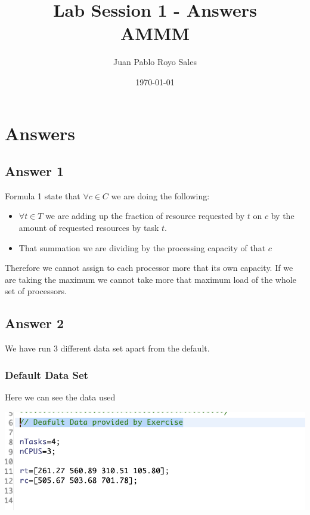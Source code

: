 \documentclass[12pt, a4paper]{article}
\title{
  Lab Session 1 - Answers \\
  AMMM
}
\author{Juan Pablo Royo Sales}
\date\today
\begin{document}
\begin{titlingpage}
  \maketitle
\end{titlingpage}

\section{Answers}
\subsection{Answer 1}\label{answer_1}

Formula 1 state that $\forall c \in C$ we are doing the following:


\begin{itemize}
  \item $\forall t \in T$ we are adding up the fraction of resource requested by
    $t$ on $c$ by the amount of requested resources by task $t$.
  \item That summation we are dividing by the processing capacity of that $c$
\end{itemize}

Therefore we cannot assign to each processor more that its own capacity. If we
are taking the maximum we cannot take more that maximum load of the whole set of processors.


\subsection{Answer 2}

We have run 3 different data set apart from the default.

\subsubsection{Default Data Set}

Here we can see the data used

\includegraphics{deafult_data}
\end{document}
